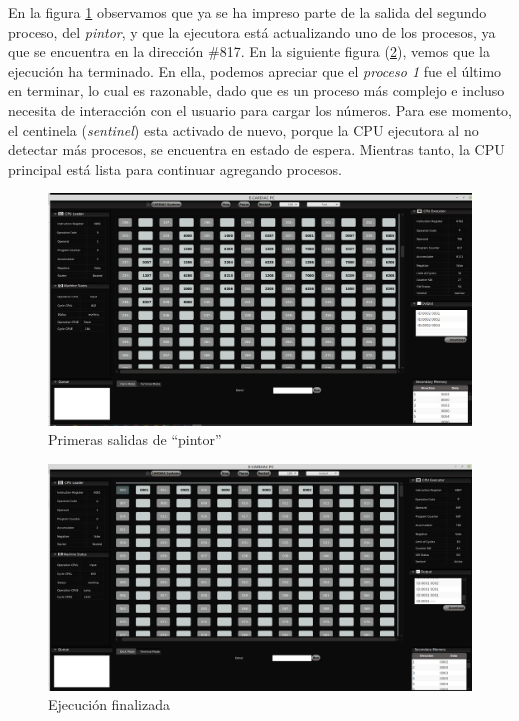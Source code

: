\documentclass[letterpaper,12pt,oneside]{book}
\begin{document}
			
			En la figura \ref{fig:vm_starting_to_print_pintor} observamos
			que ya se ha impreso parte de la salida del segundo proceso, del \textit{pintor}, y
			que la ejecutora está actualizando uno de los procesos, ya que se encuentra
			en la dirección \#817. En la siguiente figura (\ref{fig:vm_finish_the_execution}),
			 vemos que la ejecución ha terminado. En ella, podemos apreciar
			que el \textit{proceso 1} fue el último en terminar, lo cual es razonable, dado que es un proceso más complejo e incluso necesita
			de interacción con el usuario para cargar los números. Para ese momento, el centinela 	(\textit{sentinel}) esta
			activado de nuevo, porque la CPU ejecutora al no detectar más procesos, se encuentra en estado de espera. Mientras tanto,
			la CPU principal
			está lista para continuar agregando procesos. 
			
			
			
			\begin{figure}[h]		
				\centering
				\includegraphics[scale=0.33]{media/Paralela/vm_starting_to_print_pintor.png}
				\caption{Primeras salidas de ``pintor''}
				\label{fig:vm_starting_to_print_pintor}
			\end{figure}	
			
			
			\begin{figure}[h]		
				\centering
				\includegraphics[scale=0.33]{media/Paralela/vm_finish_the_execution.png}
				\caption{Ejecución finalizada}
				\label{fig:vm_finish_the_execution}
			\end{figure}	
			
\end{document}
